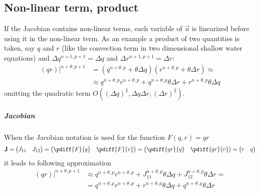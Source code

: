 \subsection{Non-linear term, product}\label{sec:jacobians_with_non_linear_product_term}
If the Jacobian contains non-linear terms, each variable of $\vec{u}$ is linearized before using it in the non-linear term.
As an example a product of two quantities is taken, say $q$ and $r$ (like the convection term in two dimensional shallow water equations) and  $\Delta q^{n+1, p+1} = \Delta q$ and  $\Delta r^{n+1, p+1} = \Delta r$:
\begin{align}
    \left.(qr)\right|^{n+\theta, p+1} & = \left( q^{n+\theta, p} + \theta  \Delta q \right) \left( r^{n+\theta, p} + \theta  \Delta r\right) \approx
    \\
    & \approx  q^{n+\theta, p} r^{n+\theta, p} + q^{n+\theta, p} \theta \Delta r + r^{n+\theta, p} \theta \Delta q
\end{align}
omitting the quadratic term $O((\Delta q)^2, \Delta q \Delta r, (\Delta r)^2)$.
\subparagraph*{Jacobian}
When the Jacobian notation is  used for the function $F(q,r) = qr$
\begin{align}
    \mat{J} =
    \begin{pmatrix}
        J_{11} & J_{12}
    \end{pmatrix}
    =
    \begin{pmatrix}
        \pdiff{F}{q} & \pdiff{F}{r}
    \end{pmatrix}
    =
    \begin{pmatrix}
        \pdiff{qr}{q} & \pdiff{qr}{r}
    \end{pmatrix}
    =
    \begin{pmatrix}
        r & q
    \end{pmatrix}
\end{align}
 it leads to following approximation
\begin{align}
    \left.(qr)\right|^{n+\theta, p+1} &  \approx  q^{n+\theta, p} r^{n+\theta, p}
    + J_{11}^{n+\theta, p} \theta \Delta q
    + J_{12}^{n+\theta, p} \theta \Delta r =
    \\
    & = q^{n+\theta, p} r^{n+\theta, p}
    + r^{n+\theta, p} \theta \Delta q + q^{n+\theta, p} \theta \Delta r
\end{align}

